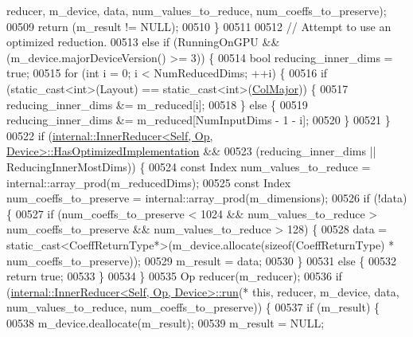 \begin{DoxyCode}
      reducer, m\_device, data, num\_values\_to\_reduce, num\_coeffs\_to\_preserve);
00509       \textcolor{keywordflow}{return} (m\_result != NULL);
00510     \}
00511 
00512     \textcolor{comment}{// Attempt to use an optimized reduction.}
00513     \textcolor{keywordflow}{else} \textcolor{keywordflow}{if} (RunningOnGPU && (m\_device.majorDeviceVersion() >= 3)) \{
00514       \textcolor{keywordtype}{bool} reducing\_inner\_dims = \textcolor{keyword}{true};
00515       \textcolor{keywordflow}{for} (\textcolor{keywordtype}{int} i = 0; i < NumReducedDims; ++i) \{
00516         \textcolor{keywordflow}{if} (static\_cast<int>(Layout) == \textcolor{keyword}{static\_cast<}\textcolor{keywordtype}{int}\textcolor{keyword}{>}(\hyperlink{group__enums_ggaacded1a18ae58b0f554751f6cdf9eb13a0cbd4bdd0abcfc0224c5fcb5e4f6669a}{ColMajor})) \{
00517           reducing\_inner\_dims &= m\_reduced[i];
00518         \} \textcolor{keywordflow}{else} \{
00519           reducing\_inner\_dims &= m\_reduced[NumInputDims - 1 - i];
00520         \}
00521       \}
00522       \textcolor{keywordflow}{if} (\hyperlink{struct_eigen_1_1internal_1_1_inner_reducer}{internal::InnerReducer<Self, Op, Device>::HasOptimizedImplementation}
       &&
00523           (reducing\_inner\_dims || ReducingInnerMostDims)) \{
00524         \textcolor{keyword}{const} Index num\_values\_to\_reduce = internal::array\_prod(m\_reducedDims);
00525         \textcolor{keyword}{const} Index num\_coeffs\_to\_preserve = internal::array\_prod(m\_dimensions);
00526         \textcolor{keywordflow}{if} (!data) \{
00527           \textcolor{keywordflow}{if} (num\_coeffs\_to\_preserve < 1024 && num\_values\_to\_reduce > num\_coeffs\_to\_preserve && 
      num\_values\_to\_reduce > 128) \{
00528             data = \textcolor{keyword}{static\_cast<}CoeffReturnType*\textcolor{keyword}{>}(m\_device.allocate(\textcolor{keyword}{sizeof}(CoeffReturnType) * 
      num\_coeffs\_to\_preserve));
00529             m\_result = data;
00530           \}
00531           \textcolor{keywordflow}{else} \{
00532             \textcolor{keywordflow}{return} \textcolor{keyword}{true};
00533           \}
00534         \}
00535         Op reducer(m\_reducer);
00536         \textcolor{keywordflow}{if} (\hyperlink{struct_eigen_1_1internal_1_1_inner_reducer}{internal::InnerReducer<Self, Op, Device>::run}(*\textcolor{keyword}{
      this}, reducer, m\_device, data, num\_values\_to\_reduce, num\_coeffs\_to\_preserve)) \{
00537           \textcolor{keywordflow}{if} (m\_result) \{
00538             m\_device.deallocate(m\_result);
00539             m\_result = NULL;

\end{DoxyCode}
